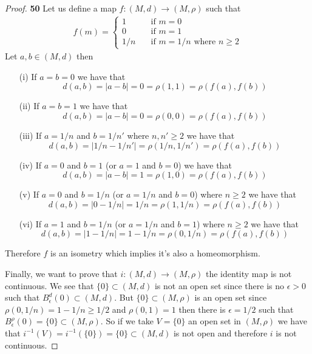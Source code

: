 \documentclass[11pt]{article}
\theoremstyle{definition}
\begin{document}
\cleardoublepage
    \begin{proof}{\textbf{50}}
        Let us define a map $f:(M,d) \to (M,\rho)$ such that
        \begin{align*}
            f(m) = \begin{cases}
                1 &\quad\text{if }m = 0\\
                0 &\quad\text{if }m = 1\\
                1/n &\quad\text{if }m = 1/n\text{ where }n \geq 2
            \end{cases}
        \end{align*}
        Let $a,b \in (M,d)$ then
        \begin{itemize}
            \item [(i)] If $a=b=0$ we have that
            $$d(a,b) = |a-b| = 0 = \rho(1, 1) = \rho(f(a), f(b))$$
            \item [(ii)] If $a=b=1$ we have that 
            $$d(a,b) = |a-b| = 0 = \rho(0,0) = \rho(f(a), f(b))$$
            \item [(iii)] If $a=1/n$ and $b=1/n'$ where $n,n' \geq 2$ we have
            that 
            $$d(a,b) = |1/n-1/n'| = \rho(1/n,1/n') = \rho(f(a), f(b))$$
            \item [(iv)] If $a=0$ and $b=1$ (or $a=1$ and $b=0$) we have that 
            $$d(a,b) = |a-b| = 1 = \rho(1,0) = \rho(f(a), f(b))$$
            \item [(v)] If $a=0$ and $b=1/n$ (or $a=1/n$ and $b=0$) where
            $n \geq 2$ we have that 
            $$d(a,b) = |0-1/n| = 1/n = \rho(1, 1/n) = \rho(f(a), f(b))$$
            \item [(vi)] If $a=1$ and $b=1/n$ (or $a=1/n$ and $b=1$) where
            $n \geq 2$ we have that 
            $$d(a,b) = |1-1/n| =1 - 1/n = \rho(0, 1/n) = \rho(f(a), f(b))$$
        \end{itemize}
        Therefore $f$ is an isometry which implies it's also a homeomorphism.

        Finally, we want to prove that $i:(M,d) \to (M, \rho)$ the identity map
        is not continuous. We see that $\{0\} \subset (M,d)$ is not an open set
        since there is no $\epsilon > 0$ such that $B_\epsilon^d(0) \subset (M,d)$.
        But $\{0\} \subset (M,\rho)$ is an open set since
        $\rho(0,1/n) = 1 - 1/n \geq 1/2$ and $\rho(0,1) = 1$ then there is
        $\epsilon = 1/2$ such that $B_\epsilon^\rho(0) = \{0\} \subset (M,\rho)$.
        So if we take $V=\{0\}$ an open set in $(M,\rho)$ we have that
        $i^{-1}(V) = i^{-1}(\{0\}) = \{0\} \subset (M,d)$ is not open and
        therefore $i$ is not continuous.
    \end{proof}
\end{document}
